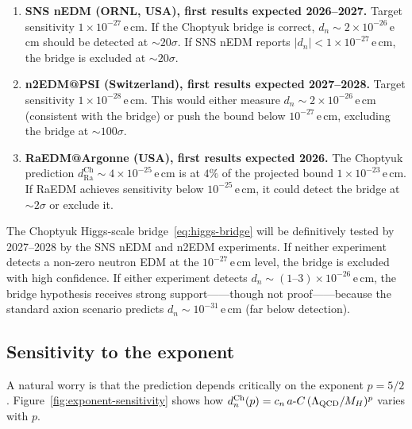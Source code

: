 \begin{enumerate}[leftmargin=2em,itemsep=0.3em]
\item \textbf{SNS nEDM (ORNL, USA), first results expected 2026--2027.}
      Target sensitivity $1\times 10^{-27}\,$e\,cm.  If the Choptyuk
      bridge is correct, $d_n\sim 2\times 10^{-26}\,$e\,cm should be
      detected at $\sim 20\sigma$.  If SNS nEDM reports
      $|d_n|<1\times 10^{-27}\,$e\,cm, the bridge is excluded at
      $\sim 20\sigma$.

\item \textbf{n2EDM@PSI (Switzerland), first results expected 2027--2028.}
      Target sensitivity $1\times 10^{-28}\,$e\,cm.  This would either
      measure $d_n\sim 2\times 10^{-26}\,$e\,cm (consistent with the
      bridge) or push the bound below $10^{-27}\,$e\,cm, excluding the
      bridge at $\sim 100\sigma$.

\item \textbf{RaEDM@Argonne (USA), first results expected 2026.}
      The Choptyuk prediction $d_{\mathrm{Ra}}^{\mathrm{Ch}}\sim
      4\times 10^{-25}\,$e\,cm is at $4\%$ of the projected bound
      $1\times 10^{-23}\,$e\,cm.  If RaEDM achieves sensitivity below
      $10^{-25}\,$e\,cm, it could detect the bridge at $\sim 2\sigma$ or
      exclude it.
\end{enumerate}

\begin{keyfind}
The Choptyuk Higgs-scale bridge~\eqref{eq:higgs-bridge} will be
definitively tested by 2027--2028 by the SNS nEDM and n2EDM experiments.
If neither experiment detects a non-zero neutron EDM at the
$10^{-27}\,$e\,cm level, the bridge is excluded with high confidence.
If either experiment detects $d_n\sim (1\text{--}3)\times 10^{-26}\,$e\,cm,
the bridge hypothesis receives strong support——though not proof——because
the standard axion scenario predicts $d_n\sim 10^{-31}\,$e\,cm (far
below detection).
\end{keyfind}

\subsection{Sensitivity to the exponent}
\label{ssec:exponent-sensitivity}

A natural worry is that the prediction depends critically on the
exponent $p=5/2$.  Figure~\ref{fig:exponent-sensitivity} shows how
$d_n^{\mathrm{Ch}}(p)=c_n\,a\text{-}C\,(\Lambda_{\mathrm{QCD}}/M_H)^p$ varies with $p$.

